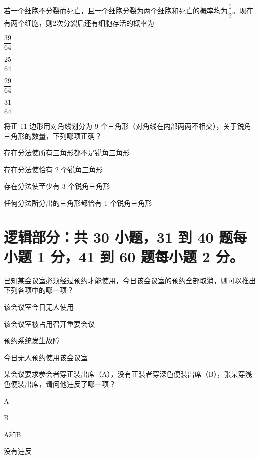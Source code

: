 \documentclass{exam-zh}
\begin{document}
\begin{question}
若一个细胞不分裂而死亡，且一个细胞分裂为两个细胞和死亡的概率均为$\dfrac{1}{2}$。现在有两个细胞，则2次分裂后还有细胞存活的概率为 \paren[]
\begin{choices}
  \item $\dfrac{39}{64}$
  \item $\dfrac{25}{64}$
  \item $\dfrac{29}{64}$
  \item $\dfrac{31}{64}$
\end{choices}
\end{question}

\begin{question}
将正 11 边形用对角线划分为 9 个三角形（对角线在内部两两不相交），关于锐角三角形的数量，下列哪项正确？ \paren[]
\begin{choices}
  \item 存在分法使所有三角形都不是锐角三角形
  \item 存在分法使恰有 2 个锐角三角形
  \item 存在分法使至少有 3 个锐角三角形
  \item 任何分法所分出的三角形都恰有 1 个锐角三角形
\end{choices}
\end{question}


\section{%
  逻辑部分：共 30 小题，31 到 40 题每小题 1 分，41 到 60 题每小题 2 分。
}


\begin{question}
已知某会议室必须经过预约才能使用，今日该会议室的预约全部取消，则可以推出下列各项中的哪一项？ \paren[]
\begin{choices}
  \item 该会议室今日无人使用
  \item 该会议室被占用召开重要会议
  \item 预约系统发生故障
  \item 今日无人预约使用该会议室
\end{choices}
\end{question}

\begin{question}
某会议要求参会者穿正装出席（A），没有正装者穿深色便装出席（B），张某穿浅色便装出席，请问他违反了哪一项？ \paren[]
\begin{choices}
  \item A
  \item B
  \item A和B
  \item 没有违反
\end{choices}
\end{question}
\end{document}
